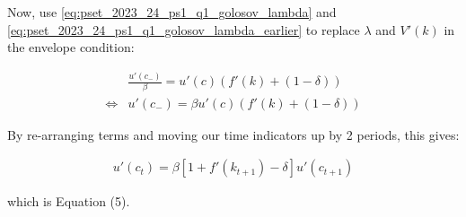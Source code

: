 Now, use \eqref{eq:pset_2023_24_ps1_q1_golosov_lambda} and \eqref{eq:pset_2023_24_ps1_q1_golosov_lambda_earlier} to
replace $\lambda$ and $V'(k)$ in the envelope condition:

\begin{align}
    &\frac{u'(c_{-})}{\beta} = u'(c)(f'(k) + (1 - \delta)) \\
    \Leftrightarrow & u'(c_{-}) = \beta u'(c)(f'(k) + (1 - \delta))
\end{align}

By re-arranging terms and moving our time indicators up by 2 periods, this gives:

\begin{align}
    u'(c_t) = \beta[1 + f'(k_{t+1}) - \delta]u'(c_{t+1})
\end{align}

which is Equation (5).